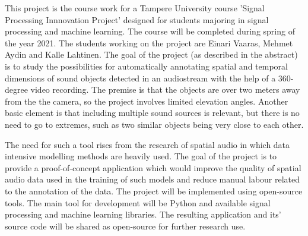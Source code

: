 This project is the course work for a Tampere University course 'Signal Processing Innnovation Project' designed for students majoring in signal processing and machine learning. The course will be completed during spring of the year 2021. The students working on the project are Einari Vaaras, Mehmet Aydin and Kalle Lahtinen. The goal of the project (as described in the abstract) is to study the possibilities for automatically annotating spatial and temporal dimensions of sound objects detected in an audiostream with the help of a 360-degree video recording. The premise is that the objects are over two meters away from the the camera, so the project involves limited elevation angles. Another basic element is that including multiple sound sources is relevant, but there is no need to go to extremes, such as two similar objects being very close to each other.

The need for such a tool rises from the research of spatial audio in which data intensive modelling methods are heavily used. The goal of the project is to provide a proof-of-concept application which would improve the quality of spatial audio data used in the training of such models and reduce manual labour related to the annotation of the data. The project will be implemented using open-source tools. The main tool for development will be Python and available signal processing and machine learning libraries. The resulting application and its' source code will be shared as open-source for further research use.  